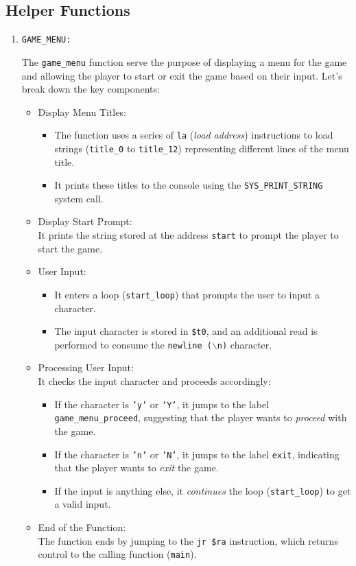 \subsection{Helper Functions}
\begin{enumerate}
    \item \large{\texttt{GAME\_MENU:}}
    
    \qquad The \texttt{game\_menu} function serve the purpose of displaying a menu for the game and allowing the player to start or exit the game based on their input. Let's break down the key components:
    \begin{itemize}
        \item Display Menu Titles:
        \begin{itemize}
            \item The function uses a series of \texttt{la} (\textit{load address}) instructions to load strings (\texttt{title\_0} to \texttt{title\_12}) representing different lines of the menu title.
            \item It prints these titles to the console using the \texttt{SYS\_PRINT\_STRING} system call.
        \end{itemize}
        \item Display Start Prompt: \\
        It prints the string stored at the address \texttt{start} to prompt the player to start the game.
        \item User Input:
        \begin{itemize}
            \item It enters a loop (\texttt{start\_loop}) that prompts the user to input a character.
            \item The input character is stored in \texttt{\$t0}, and an additional read is performed to consume the \texttt{newline ($\backslash$n)} character.
        \end{itemize}
        \item Processing User Input: \\[6pt]
        It checks the input character and proceeds accordingly:
        \begin{itemize}
            \item If the character is \texttt{'y'} or \texttt{'Y'}, it jumps to the label \texttt{game\_menu\_proceed}, suggesting that the player wants to \textit{proceed} with the game.
            \item If the character is \texttt{'n'} or \texttt{'N'}, it jumps to the label \texttt{exit}, indicating that the player wants to \textit{exit} the game.
            \item If the input is anything else, it \textit{continues} the loop (\texttt{start\_loop}) to get a valid input.
        \end{itemize}
        \item End of the Function: \\[6pt]
        The function ends by jumping to the \texttt{jr \$ra} instruction, which returns control to the calling function (\texttt{main}).\\
    \end{itemize}


\end{enumerate}
